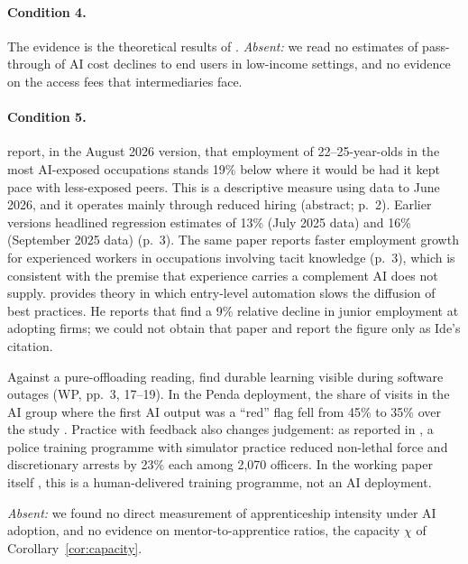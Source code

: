 \documentclass[12pt]{article}
\theoremstyle{remark}
\begin{document}
\paragraph{Condition 4.} The evidence is the theoretical results of \citet[pp.~99, 106, 110--111]{athey2026competition}. \emph{Absent:} we read no estimates of pass-through of AI cost declines to end users in low-income settings, and no evidence on the access fees that intermediaries face.

\paragraph{Condition 5.} \citet{brynjolfsson2025canaries} report, in the August 2026 version, that employment of 22--25-year-olds in the most AI-exposed occupations stands 19\% below where it would be had it kept pace with less-exposed peers. This is a descriptive measure using data to June 2026, and it operates mainly through reduced hiring (abstract; p.~2). Earlier versions headlined regression estimates of 13\% (July 2025 data) and 16\% (September 2025 data) (p.~3). The same paper reports faster employment growth for experienced workers in occupations involving tacit knowledge (p.~3), which is consistent with the premise that experience carries a complement AI does not supply. \citet[pp.~26--28]{ide2025automation} provides theory in which entry-level automation slows the diffusion of best practices. He reports that \citet{hosseini2025seniority} find a 9\% relative decline in junior employment at adopting firms; we could not obtain that paper and report the figure only as Ide's citation.

Against a pure-offloading reading, \citet{brynjolfsson2025work} find durable learning visible during software outages (WP, pp.~3, 17--19). In the Penda deployment, the share of visits in the AI group where the first AI output was a ``red'' flag fell from 45\% to 35\% over the study \citep[p.~18]{korom2025penda}. Practice with feedback also changes judgement: as reported in \citet[p.~288]{ludwig2026reflective}, a police training programme with simulator practice reduced non-lethal force and discretionary arrests by 23\% each among 2,070 officers. In the working paper itself \citep[pp.~5, 31--32]{dube2025policing}, this is a human-delivered training programme, not an AI deployment.

\emph{Absent:} we found no direct measurement of apprenticeship intensity under AI adoption, and no evidence on mentor-to-apprentice ratios, the capacity $\chi$ of Corollary~\ref{cor:capacity}.
\end{document}
